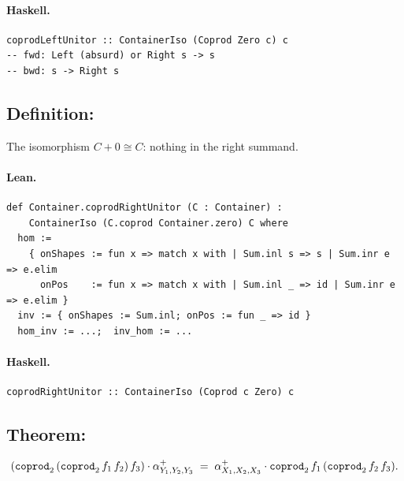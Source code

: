 \documentclass[11pt,a4paper]{article}
\begin{document}
\paragraph{Haskell.}
\begin{lstlisting}[style=haskell]
coprodLeftUnitor :: ContainerIso (Coprod Zero c) c
-- fwd: Left (absurd) or Right s -> s
-- bwd: s -> Right s
\end{lstlisting}


\subsection{Definition: }

\begin{defn}
The isomorphism $C + 0 \cong C$: nothing in the right summand.
\end{defn}

\paragraph{Lean.}
\begin{lstlisting}[style=lean]
def Container.coprodRightUnitor (C : Container) :
    ContainerIso (C.coprod Container.zero) C where
  hom :=
    { onShapes := fun x => match x with | Sum.inl s => s | Sum.inr e => e.elim
      onPos    := fun x => match x with | Sum.inl _ => id | Sum.inr e => e.elim }
  inv := { onShapes := Sum.inl; onPos := fun _ => id }
  hom_inv := ...;  inv_hom := ...
\end{lstlisting}

\paragraph{Haskell.}
\begin{lstlisting}[style=haskell]
coprodRightUnitor :: ContainerIso (Coprod c Zero) c
\end{lstlisting}


\subsection{Theorem: }

\begin{thm}
\[
  (\texttt{coprod}_2\,(\texttt{coprod}_2\,f_1\,f_2)\,f_3) \cdot \alpha^+_{Y_1,Y_2,Y_3}
  \;=\;
  \alpha^+_{X_1,X_2,X_3} \cdot \texttt{coprod}_2\,f_1\,(\texttt{coprod}_2\,f_2\,f_3).
\]
\end{thm}
\end{document}
